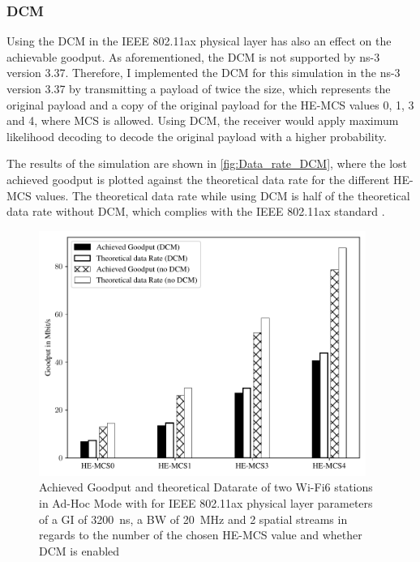 \subsubsection*{\acf{DCM}}
Using the \ac{DCM} in the IEEE 802.11ax physical layer has also an effect on the achievable goodput.
As aforementioned, the \ac{DCM} is not supported by ns-3 version 3.37.
Therefore, I implemented the \ac{DCM} for this simulation in the ns-3 version 3.37 by transmitting a payload of twice the size, which represents the original payload and a
copy of the original payload for the HE-\ac{MCS} values 0, 1, 3 and 4, where \ac{MCS} is allowed.
Using \ac{DCM}, the receiver would apply maximum likelihood decoding to decode the original payload with a higher probability.

The results of the simulation are shown in \autoref{fig:Data_rate_DCM}, where the lost achieved goodput is plotted against
the theoretical data rate for the different HE-\ac{MCS} values.
The theoretical data rate while using \ac{DCM} is half of the
theoretical data rate without \ac{DCM}, which complies with the IEEE 802.11ax standard \cite{noauthor_ieee_2021}.
\begin{figure}[H]%
	\centering
	\includegraphics[width=0.95\textwidth]{figures/DCM_dataRate_simulation.pdf}
	\caption{Achieved Goodput and theoretical Datarate of two Wi-Fi6 stations in Ad-Hoc Mode with for IEEE 802.11ax physical layer parameters of a \acf{GI} of \SI{3200}{\nano\second}, a \acf{BW} of \SI{20}{\mega\hertz} and 2 spatial streams  in regards to the number of the chosen HE-\acf{MCS} value and whether \acf{DCM} is enabled}%
	\label{fig:Data_rate_DCM}%
\end{figure}

